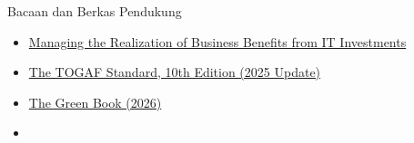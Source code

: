 \documentclass[aspectratio=169, table, 12pt]{beamer}
\begin{document}
\begin{frame}{{\Large Bacaan dan Berkas Pendukung}}
  \small
  \vspace{6pt}
  \begin{itemize}
    \item \href{https://aisel.aisnet.org/misqe/vol6/iss1/3/}{Managing the Realization of Business Benefits from IT Investments}
    \item \href{https://www.opengroup.org/togaf}{The TOGAF Standard, 10th Edition (2025 Update)}
    \item \href{https://www.gov.uk/government/publications/the-green-book--2/the-green-book-2026}{The Green Book (2026)}
    \item {}
  \end{itemize}
\end{frame}
\end{document}
